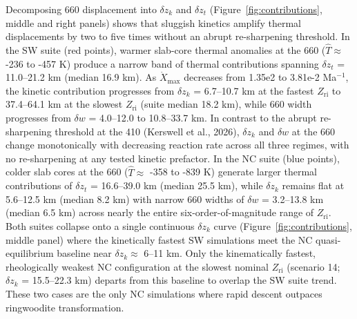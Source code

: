 \documentclass[draft,linenumbers]{agujournal2019}
\begin{document}
Decomposing 660 displacement into \(\delta z_k\) and \(\delta z_t\)
(Figure~\ref{fig:contributions}, middle and right panels) shows that
sluggish kinetics amplify thermal displacements by two to five times
without an abrupt re-sharpening threshold. In the SW suite (red points),
warmer slab-core thermal anomalies at the 660 (\(\hat{T} \approx\) -236
to -457 K) produce a narrow band of thermal contributions spanning
\(\delta z_t\) = 11.0--21.2 km (median 16.9 km). As
\(\dot{X}_\mathrm{max}\) decreases from 1.35e2 to 3.81e-2 Ma\(^{-1}\),
the kinetic contribution progresses from \(\delta z_k\) = 6.7--10.7 km
at the fastest \(Z_\mathrm{ri}\) to 37.4--64.1 km at the slowest
\(Z_\mathrm{ri}\) (suite median 18.2 km), while 660 width progresses
from \(\delta w\) = 4.0--12.0 to 10.8--33.7 km. In contrast to the
abrupt re-sharpening threshold at the 410 (Kerswell et al., 2026),
\(\delta z_k\) and \(\delta w\) at the 660 change monotonically with
decreasing reaction rate across all three regimes, with no re-sharpening
at any tested kinetic prefactor. In the NC suite (blue points), colder
slab cores at the 660 (\(\hat{T} \approx\) -358 to -839 K) generate
larger thermal contributions of \(\delta z_t\) = 16.6--39.0 km (median
25.5 km), while \(\delta z_k\) remains flat at 5.6--12.5 km (median 8.2
km) with narrow 660 widths of \(\delta w\) = 3.2--13.8 km (median 6.5
km) across nearly the entire six-order-of-magnitude range of
\(Z_\mathrm{ri}\). Both suites collapse onto a single continuous
\(\delta z_k\) curve (Figure~\ref{fig:contributions}, middle panel)
where the kinetically fastest SW simulations meet the NC
quasi-equilibrium baseline near \(\delta z_k \approx\) 6--11 km. Only
the kinematically fastest, rheologically weakest NC configuration at the
slowest nominal \(Z_\mathrm{ri}\) (scenario 14; \(\delta z_k\) =
15.5--22.3 km) departs from this baseline to overlap the SW suite trend.
These two cases are the only NC simulations where rapid descent outpaces
ringwoodite transformation.
\end{document}
